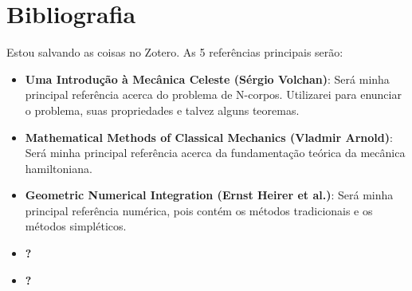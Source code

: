 \chapter{Bibliografia}

Estou salvando as coisas no Zotero. As 5 referências principais serão:

\begin{itemize}
  \item \textbf{Uma Introdução à Mecânica Celeste (Sérgio Volchan)}: Será minha principal referência acerca do problema de N-corpos. Utilizarei para enunciar o problema, suas propriedades e talvez alguns teoremas.
  \item \textbf{Mathematical Methods of Classical Mechanics (Vladmir Arnold)}: Será minha principal referência acerca da fundamentação teórica da mecânica hamiltoniana.
  \item \textbf{Geometric Numerical Integration (Ernst Heirer et al.)}: Será minha principal referência numérica, pois contém os métodos tradicionais e os métodos simpléticos.
  \item \textbf{?}
  \item \textbf{?}
\end{itemize}